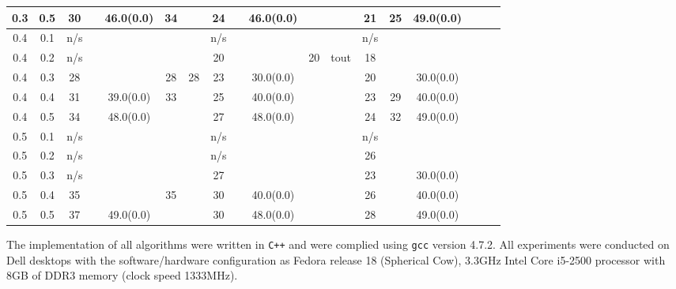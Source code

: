 \documentclass[10pt]{article}
\begin{document}
\begin{table}
\begin{tabular}{|c|c|c|c|c|c|c||c|c|c|c|c||c|c|c|c|c|c|}
	\hline
	0.3&0.5&30&  & 46.0(0.0) & 34&  & 24 &  & 46.0(0.0) &  &  & 21&25&49.0(0.0)&&\\ 
	\hline
	0.4&0.1&n/s&  &  & &  & n/s&  &  &  &  & n/s&&&&\\ 
	\hline
	0.4&0.2&n/s&  &  & &  & 20 &  && 20 & tout & 18&&&&\\ 
	\hline
	0.4&0.3&28&  &  & 28& 28 & 23 &  &30.0(0.0)  &  &  & 20&&30.0(0.0)&&\\ 
	\hline
	0.4&0.4&31&  & 39.0(0.0) & 33&  & 25 &  & 40.0(0.0)&  &  & 23&29&40.0(0.0)&&\\ 
	\hline
	0.4&0.5&34&  & 48.0(0.0) & &  & 27 &  & 48.0(0.0) &  &  &24&32&49.0(0.0)&&\\ 
	\hline
	0.5&0.1&n/s&  &  & &  & n/s &  &  &  &  & n/s&&&&\\ 
	\hline
	0.5&0.2&n/s&  &  & &  & n/s&  &  &  &  & 26&&&&\\ 
	\hline
	0.5&0.3&n/s&  &  & &  & 27 &  &  &  & &23&&30.0(0.0)&&\\ 
	\hline
	0.5&0.4&35&  & & 35&  & 30 &  &40.0(0.0)&  &  & 26&&40.0(0.0)&&\\ 
	\hline
	0.5&0.5&37&  & 49.0(0.0) & &  & 30 &  & 48.0(0.0) &  &  & 28&&49.0(0.0)&&\\ 
	\hline
  \end{tabular}
  \label{tab:random50100}
\end{table}

The implementation of all algorithms were written in \texttt{C++} and
were complied using \texttt{gcc} version 4.7.2.  All experiments were conducted
on Dell desktops with the software/hardware configuration as Fedora release 18 (Spherical Cow), 3.3GHz Intel Core i5-2500
processor with 8GB of DDR3 memory (clock speed 1333MHz).
\end{document}
